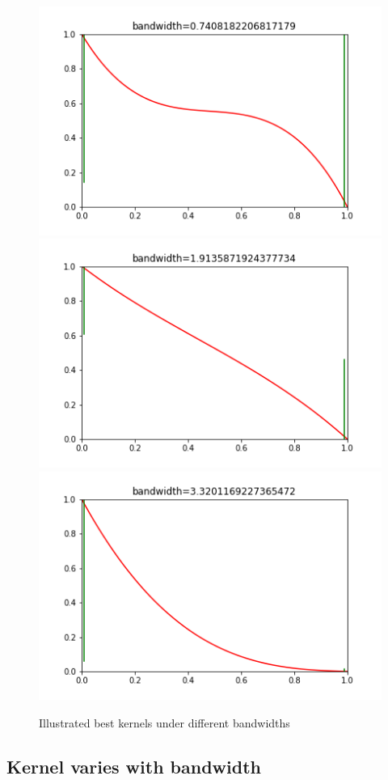 \documentclass[a4 paper,12pt]{article}
\begin{document}
\begin{figure}
   \centering
   \includegraphics[scale=0.3]{case30_frame0000000.png}
   \includegraphics[scale=0.3]{case30_frame0000031.png}
   \includegraphics[scale=0.3]{case30_frame0000049.png}
   \caption{Illustrated best kernels under different bandwidths}
   \label{fig:kernels}
\end{figure}
\subsection*{Kernel varies with bandwidth}
\end{document}
